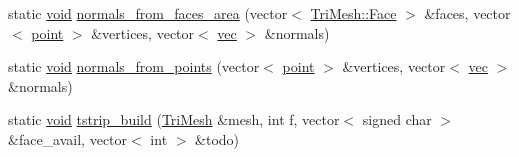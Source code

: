 \begin{DoxyCompactItemize}
\item 
static \hyperlink{namespacetrimesh_a784ddfd979e1c579bda795a8edfc3f43}{void} \hyperlink{namespacetrimesh_a375cb4640ad8f6e5c176ca31512d12c4}{normals\+\_\+from\+\_\+faces\+\_\+area} (vector$<$ \hyperlink{classtrimesh_1_1TriMesh_a06cb64bb6435d5cf4d7b24d2950fe8e7}{Tri\+Mesh\+::\+Face} $>$ \&faces, vector$<$ \hyperlink{namespacetrimesh_a325b99fd6454b22fa4c4bc3223271b2c}{point} $>$ \&vertices, vector$<$ \hyperlink{namespacetrimesh_a4fc2b83feba99c931f837a0c7d4b4df1}{vec} $>$ \&normals)
\item 
static \hyperlink{namespacetrimesh_a784ddfd979e1c579bda795a8edfc3f43}{void} \hyperlink{namespacetrimesh_a85064c56f0561f54362cff887a77bd63}{normals\+\_\+from\+\_\+points} (vector$<$ \hyperlink{namespacetrimesh_a325b99fd6454b22fa4c4bc3223271b2c}{point} $>$ \&vertices, vector$<$ \hyperlink{namespacetrimesh_a4fc2b83feba99c931f837a0c7d4b4df1}{vec} $>$ \&normals)
\item 
static \hyperlink{namespacetrimesh_a784ddfd979e1c579bda795a8edfc3f43}{void} \hyperlink{namespacetrimesh_ab831661ae18fac13b4afec2d2aec051e}{tstrip\+\_\+build} (\hyperlink{classtrimesh_1_1TriMesh}{Tri\+Mesh} \&mesh, int f, vector$<$ signed char $>$ \&face\+\_\+avail, vector$<$ int $>$ \&todo)
\end{DoxyCompactItemize}
